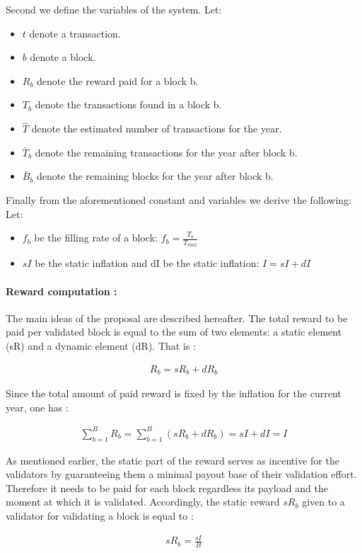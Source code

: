 Second we define the variables of the system. Let:
\begin{itemize}
	\item $t$ denote a transaction.
	\item $b$ denote a block.
	\item $R_b$ denote the reward paid for a block b.
	\item $T_b$ denote the transactions found in a block b.
	\item $\hat{T}$ denote the estimated number of transactions for the year.
	\item $\bar{T}_b$ denote the remaining transactions for the year after block b.
	\item $\bar{B}_b$ denote the remaining blocks for the year after block b.
\end{itemize}

Finally from the aforementioned constant and variables we derive the following: Let:
\begin{itemize}
	\item $f_b$ be the filling rate of a block:  $f_b=\frac{T_b}{T_{max}}$
	\item $sI$ be the static inflation and dI be the static inflation: $I=sI+dI$	
\end{itemize}

\paragraph{Reward computation :}
The main ideas of the proposal are described hereafter. The total reward to be paid per validated block is equal to the sum of two elements: a static element (sR) and a dynamic element (dR). That is : 
\begin{ceqn}
	\begin{align}
		R_b = sR_b +dR_b
	\end{align}
\end{ceqn}


Since the total amount of paid reward is fixed by the inflation for the current year, one has :
\begin{ceqn}
	\begin{align}
		\sum_{b=1}^{B}R_b=\sum_{b=1}^{B}(sR_b +dR_b) =sI + dI = I 
	\end{align}
\end{ceqn}

As mentioned earlier, the static part of the reward serves as incentive for the validators by  guaranteeing them a minimal payout base of their validation effort. Therefore it needs to be paid for each block regardless its payload and the moment at which it is validated. Accordingly, the static reward $sR_b$ given to a validator for validating a block is equal to :
\begin{ceqn}
	\begin{align}
		sR_b=\frac{sI}{B}
	\end{align}
\end{ceqn}

